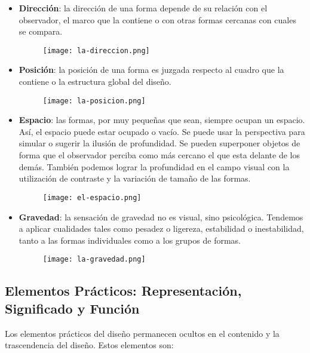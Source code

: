 \begin{itemize}
    \item \textbf{Dirección}: la dirección de una forma depende de su relación con el observador, el marco que la contiene o con otras formas cercanas con cuales se compara.

    \begin{figure}[H]
        \centering
        \texttt{[image: la-direccion.png]}
    \end{figure}

    \item \textbf{Posición}: la posición de una forma es juzgada respecto al cuadro que la contiene o la estructura global del diseño.

    \begin{figure}[H]
        \centering
        \texttt{[image: la-posicion.png]}
    \end{figure}

    \item \textbf{Espacio}: las formas, por muy pequeñas que sean, siempre ocupan un espacio. Así, el espacio puede estar ocupado o vacío. Se puede usar la perspectiva para simular o sugerir la ilusión de profundidad. Se pueden superponer objetos de forma que el observador perciba como más cercano el que esta delante de los demás. También podemos lograr la profundidad en el campo visual con la utilización de contraste y la variación de tamaño de las formas.

    \begin{figure}[H]
        \centering
        \texttt{[image: el-espacio.png]}
    \end{figure}

    \item \textbf{Gravedad}: la sensación de gravedad no es visual, sino psicológica. Tendemos a aplicar cualidades tales como pesadez o ligereza, estabilidad o inestabilidad, tanto a las formas individuales como a los grupos de formas.

    \begin{figure}[H]
        \centering
        \texttt{[image: la-gravedad.png]}
    \end{figure}
\end{itemize}

\subsection{Elementos Prácticos: Representación, Significado y Función}
Los elementos prácticos del diseño permanecen ocultos en el contenido y la trascendencia del diseño. Estos elementos son:

